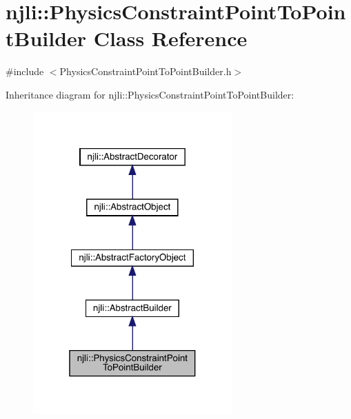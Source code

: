 \hypertarget{classnjli_1_1_physics_constraint_point_to_point_builder}{}\section{njli\+:\+:Physics\+Constraint\+Point\+To\+Point\+Builder Class Reference}
\label{classnjli_1_1_physics_constraint_point_to_point_builder}


{\ttfamily \#include $<$Physics\+Constraint\+Point\+To\+Point\+Builder.\+h$>$}



Inheritance diagram for njli\+:\+:Physics\+Constraint\+Point\+To\+Point\+Builder\+:\nopagebreak
\begin{figure}[H]
\begin{center}
\leavevmode
\includegraphics[width=217pt]{classnjli_1_1_physics_constraint_point_to_point_builder__inherit__graph}
\end{center}
\end{figure}


